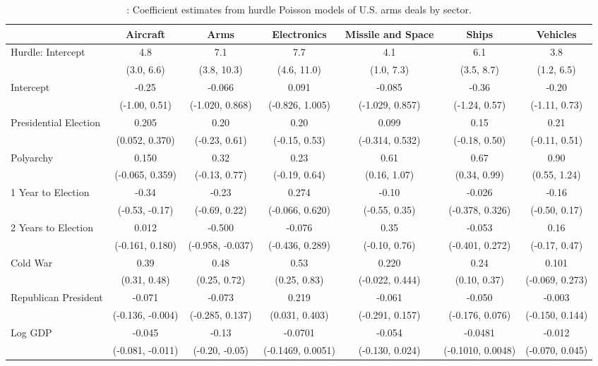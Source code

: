 \begin{table}[H]

\caption{\label{tab:pois-regs-sector}: Coefficient estimates from hurdle Poisson models of U.S. arms deals by sector.}
\centering
\fontsize{8}{10}\selectfont
\begin{tabular}[t]{lcccccc}
\toprule
  & Aircraft & Arms & Electronics & Missile and Space & Ships & Vehicles\\
\midrule
Hurdle: Intercept & 4.8 & 7.1 & 7.7 & 4.1 & 6.1 & 3.8\\
 & (3.0, 6.6) & (3.8, 10.3) & (4.6, 11.0) & (1.0, 7.3) & (3.5, 8.7) & (1.2, 6.5)\\
Intercept & -0.25 & -0.066 & 0.091 & -0.085 & -0.36 & -0.20\\
 & (-1.00, 0.51) & (-1.020, 0.868) & (-0.826, 1.005) & (-1.029, 0.857) & (-1.24, 0.57) & (-1.11, 0.73)\\
Presidential Election & 0.205 & 0.20 & 0.20 & 0.099 & 0.15 & 0.21\\
 & (0.052, 0.370) & (-0.23, 0.61) & (-0.15, 0.53) & (-0.314, 0.532) & (-0.18, 0.50) & (-0.11, 0.51)\\
Polyarchy & 0.150 & 0.32 & 0.23 & 0.61 & 0.67 & 0.90\\
 & (-0.065, 0.359) & (-0.13, 0.77) & (-0.19, 0.64) & (0.16, 1.07) & (0.34, 0.99) & (0.55, 1.24)\\
1 Year to Election & -0.34 & -0.23 & 0.274 & -0.10 & -0.026 & -0.16\\
 & (-0.53, -0.17) & (-0.69, 0.22) & (-0.066, 0.620) & (-0.55, 0.35) & (-0.378, 0.326) & (-0.50, 0.17)\\
2 Years to Election & 0.012 & -0.500 & -0.076 & 0.35 & -0.053 & 0.16\\
 & (-0.161, 0.180) & (-0.958, -0.037) & (-0.436, 0.289) & (-0.10, 0.76) & (-0.401, 0.272) & (-0.17, 0.47)\\
Cold War & 0.39 & 0.48 & 0.53 & 0.220 & 0.24 & 0.101\\
 & (0.31, 0.48) & (0.25, 0.72) & (0.25, 0.83) & (-0.022, 0.444) & (0.10, 0.37) & (-0.069, 0.273)\\
Republican President & -0.071 & -0.073 & 0.219 & -0.061 & -0.050 & -0.003\\
 & (-0.136, -0.004) & (-0.285, 0.137) & (0.031, 0.403) & (-0.291, 0.157) & (-0.176, 0.076) & (-0.150, 0.144)\\
Log GDP & -0.045 & -0.13 & -0.0701 & -0.054 & -0.0481 & -0.012\\
 & (-0.081, -0.011) & (-0.20, -0.05) & (-0.1469, 0.0051) & (-0.130, 0.024) & (-0.1010, 0.0048) & (-0.070, 0.045)\\

\end{tabular}
\end{table}

